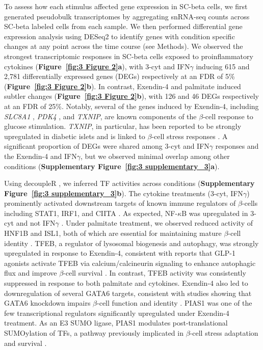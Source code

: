 To assess how each stimulus affected gene expression in SC-beta cells, we first generated pseudobulk transcriptomes by aggregating snRNA-seq counts across SC-beta labeled cells from each sample. We then performed differential gene expression analysis using DESeq2 to identify genes with condition specific changes at any point across the time course (see Methods). We observed the strongest transcriptomic responses in SC-beta cells exposed to proinflammatory cytokines (\textbf{Figure~\ref{fig:3 Figure 2}\textbf{a}}), with 3-cyt and IFN$\gamma$ inducing 615 and 2,781 differentially expressed genes (DEGs) respectively at an FDR of 5\% (\textbf{Figure~\ref{fig:3 Figure 2}\textbf{b}}). In contrast, Exendin-4 and palmitate induced subtler changes (\textbf{Figure~\ref{fig:3 Figure 2}\textbf{b}}), with 126 and 46 DEGs respectively at an FDR of 25\%. Notably, several of the genes induced by Exendin-4, including \textit{SLC8A1} \cite{Hamming2010-td}, \textit{PDK4} \cite{Arumugam2010-bq}, and \textit{TXNIP}, are known components of the $\beta$-cell response to glucose stimulation. \textit{TXNIP}, in particular, has been reported to be strongly upregulated in diabetic islets and is linked to $\beta$-cell stress responses \cite{Rutter2013-yv}. A significant proportion of DEGs were shared among 3-cyt and IFN$\gamma$ responses and the Exendin-4 and IFN$\gamma$, but we observed minimal overlap among other conditions (\textbf{Supplementary Figure~\ref{fig:3 supplementary_3}\textbf{a}}).

Using decoupleR \cite{Badia-I-Mompel2022-se}, we inferred TF activities across conditions (\textbf{Supplementary Figure~\ref{fig:3 supplementary_3}\textbf{b}}). The cytokine treatments (3-cyt, IFN$\gamma$) prominently activated downstream targets of known immune regulators of $\beta$-cells including STAT1, IRF1, and CIITA \cite{Benaglio2022-rq}. As expected, NF-$\kappa$B was upregulated in 3-cyt and not IFN$\gamma$ \cite{Melloul2008-ox}. Under palmitate treatment, we observed reduced activity of HNF1B and ISL1, both of which are essential for maintaining mature $\beta$-cell identity \cite{El-Khairi2016-so,Ediger2014-gk}. TFEB, a regulator of lysosomal biogenesis and autophagy, was strongly upregulated in response to Exendin-4, consistent with reports that GLP-1 agonists activate TFEB via calcium/calcineurin signaling to enhance autophagic flux and improve $\beta$-cell survival \cite{Zummo2022-dr}. In contrast, TFEB activity was consistently suppressed in response to both palmitate and cytokines. Exendin-4 also led to downregulation of several GATA6 targets, consistent with studies showing that GATA6 knockdown impairs $\beta$-cell function and identity \cite{Villamayor2018-uk}. PIAS1 was one of the few transcriptional regulators significantly upregulated under Exendin-4 treatment. As an E3 SUMO ligase, PIAS1 modulates post-translational SUMOylation of TFs, a pathway previously implicated in $\beta$-cell stress adaptation and survival \cite{Li2020-kg}.

